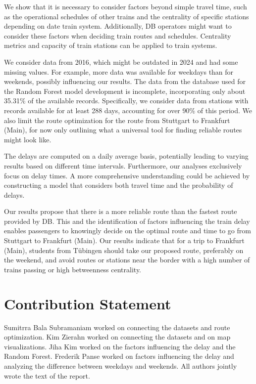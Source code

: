 \documentclass{article}
\theoremstyle{plain}
\theoremstyle{definition}
\theoremstyle{remark}
\begin{document}
	We show that it is necessary to consider factors beyond simple travel time, such as the operational schedules of other trains and the centrality of specific stations depending on date train system. Additionally, DB operators might want to consider these factors when deciding train routes and schedules. Centrality metrics and capacity of train stations can be applied to train systems. 
	
	We consider data from 2016, which might be outdated in 2024 and had some missing values. For example, more data was available for weekdays than for weekends, possibly influencing our results. The data from the database used for the Random Forest model development is incomplete, incorporating only about 35.31\% of the available records. Specifically, we consider data from stations with records available for at least 288 days, accounting for over 90\% of this period. We also limit the route optimization for the route from Stuttgart to Frankfurt (Main), for now only outlining what a universal tool for finding reliable routes might look like.
	
	The delays are computed on a daily average basis, potentially leading to varying results based on different time intervals. Furthermore, our analyses exclusively focus on delay times. A more comprehensive understanding could be achieved by constructing a model that considers both travel time and the probability of delays. 
	
	Our results propose that there is a more reliable route than the fastest route provided by DB. This and the identification of factors influencing the train delay enables passengers to knowingly decide on the optimal route and time to go from Stuttgart to Frankfurt (Main). Our results indicate that for a trip to Frankfurt (Main), students from Tübingen should take our proposed route, preferably on the weekend, and avoid routes or stations near the border with a high number of trains passing or high betweenness centrality. 
	
	
	\section*{Contribution Statement}
	
	Sumitrra Bala Subramaniam worked on connecting the datasets and route optimization. Kim Zierahn worked on connecting the datasets and on map visualizations. Jiha Kim worked on the factors influencing the delay and the Random Forest. Frederik Panse worked on factors influencing the delay and analyzing the difference between weekdays and weekends. All authors jointly wrote the text of the report.
	
	
	
	
	
	
	
	
\end{document}

